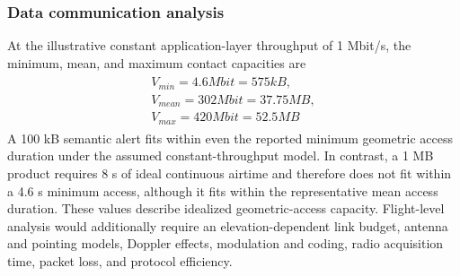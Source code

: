 \documentclass[a4paper,fleqn]{cas-dc}
\begin{document}
\subsubsection{Data communication analysis}
At the illustrative constant application-layer throughput of 1 Mbit/s, the minimum, mean, and maximum contact capacities are
\begin{eqnarray}
	\begin{aligned}
	V_{min} = 4.6 Mbit = 575 kB, \\
	V_{mean} = 302 Mbit = 37.75 MB, \\
	 V_{max} = 420 Mbit = 52.5 MB
	 \end{aligned}
\end{eqnarray}
A 100 kB semantic alert fits within even the reported minimum geometric access duration under the assumed constant-throughput model. In contrast, a 1 MB product requires 8 s of ideal continuous airtime and therefore does not fit within a 4.6 s minimum access, although it fits within the representative mean access duration.
These values describe idealized geometric-access capacity. Flight-level analysis would additionally require an elevation-dependent link budget, antenna and pointing models, Doppler effects, modulation and coding, radio acquisition time, packet loss, and protocol efficiency.
\end{document}
